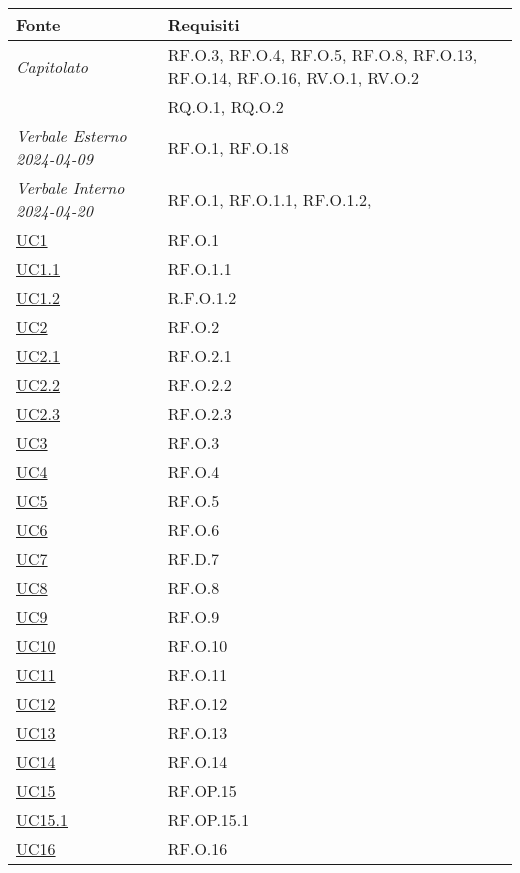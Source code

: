 \begin{longtable}{|P{4,5cm}|>{\arraybackslash}P{9cm}|}
  \hline
  \textbf{Fonte} & \textbf{Requisiti} \\
  \hline
  \emph{Capitolato} & RF.O.3, RF.O.4, RF.O.5, RF.O.8, RF.O.13, RF.O.14, RF.O.16, RV.O.1, RV.O.2 \\
  \hline
  \NdP{} & RQ.O.1, RQ.O.2 \\
  \hline
  \emph{Verbale Esterno 2024-04-09} & RF.O.1, RF.O.18 \\
  \hline
  \emph{Verbale Interno 2024-04-20} & RF.O.1, RF.O.1.1, RF.O.1.2,  \\
  \hline
  \hyperref[UC1]{UC1} & RF.O.1 \\
  \hline
  \hyperref[UC1point1]{UC1.1} & RF.O.1.1 \\
  \hline
  \hyperref[UC1]{UC1.2} & R.F.O.1.2 \\
  \hline
  \hyperref[UC2]{UC2} & RF.O.2 \\
  \hline
  \hyperref[UC2point1]{UC2.1} & RF.O.2.1 \\
  \hline
  \hyperref[UC2point2]{UC2.2} & RF.O.2.2 \\
  \hline
  \hyperref[UC2point3]{UC2.3} & RF.O.2.3 \\
  \hline
  \hyperref[UC3]{UC3} & RF.O.3 \\
  \hline
  \hyperref[UC4]{UC4} & RF.O.4 \\
  \hline
  \hyperref[UC5]{UC5} & RF.O.5 \\
  \hline
  \hyperref[UC6]{UC6} & RF.O.6 \\
  \hline
  \hyperref[UC7]{UC7} & RF.D.7 \\
  \hline
  \hyperref[UC8]{UC8} & RF.O.8 \\
  \hline
  \hyperref[UC9]{UC9} & RF.O.9 \\
  \hline
  \hyperref[UC10]{UC10} & RF.O.10 \\
  \hline
  \hyperref[UC11]{UC11} & RF.O.11 \\
  \hline
  \hyperref[UC12]{UC12} & RF.O.12 \\
  \hline
  \hyperref[UC13]{UC13} & RF.O.13 \\
  \hline
  \hyperref[UC14]{UC14} & RF.O.14 \\
  \hline
  \hyperref[UC15]{UC15} & RF.OP.15 \\
  \hline
  \hyperref[UC15point1]{UC15.1} & RF.OP.15.1 \\
  \hline
  \hyperref[UC16]{UC16} & RF.O.16 \\
  \hline

\end{longtable}
